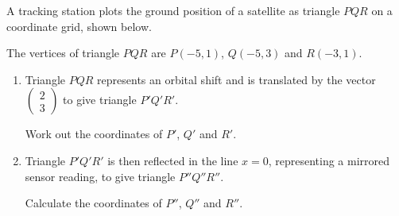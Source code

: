 \documentclass{article}
\begin{document}
\begin{preview}
\begin{question}
\noindent A tracking station plots the ground position of a satellite as triangle $PQR$ on a coordinate grid, shown below.

\begin{center}
\end{center}

\noindent The vertices of triangle $PQR$ are $P(-5,1)$, $Q(-5,3)$ and $R(-3,1)$.

\begin{enumerate}
    \item[(a)] Triangle $PQR$ represents an orbital shift and is translated by the vector $\begin{pmatrix} 2 \\ 3 \end{pmatrix}$ to give triangle $P'Q'R'$.

    Work out the coordinates of $P'$, $Q'$ and $R'$.

    \vspace{4cm}

    \item[(b)] Triangle $P'Q'R'$ is then reflected in the line $x = 0$, representing a mirrored sensor reading, to give triangle $P''Q''R''$.

    Calculate the coordinates of $P''$, $Q''$ and $R''$.

    \vspace{4cm}
\end{enumerate}
\end{question}

\end{preview}
\end{document}
